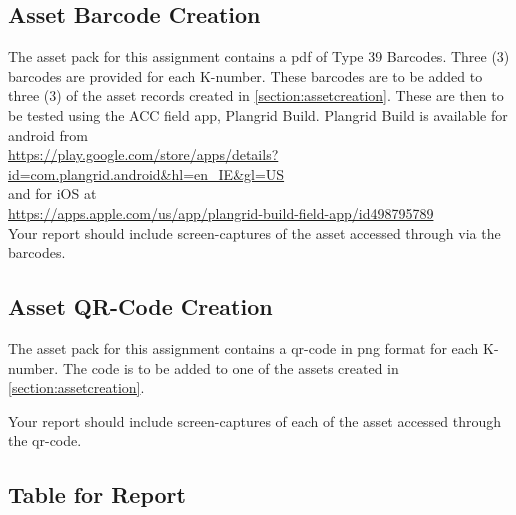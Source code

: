 \subsection{Asset Barcode Creation}
The asset pack for this assignment contains a pdf of Type 39 Barcodes.  Three (3) barcodes are provided for each K-number.  These barcodes are to be added to three (3) of the asset records created in \ref{section:assetcreation}.  These are then to be tested using the ACC field app, Plangrid Build.  Plangrid Build is available for android from\\ \href{https://play.google.com/store/apps/details?id=com.plangrid.android&hl=en_IE&gl=US}{https://play.google.com/store/apps/details?id=com.plangrid.android\&hl=en\_IE\&gl=US} \\and for iOS at\\ \href{https://apps.apple.com/us/app/plangrid-build-field-app/id498795789}{https://apps.apple.com/us/app/plangrid-build-field-app/id498795789}\\
Your report should include screen-captures of the asset accessed through via the barcodes.

\subsection{Asset QR-Code Creation}
The asset pack for this assignment contains a qr-code in png format for each K-number.  The code is to be added to one of the assets created in \ref{section:assetcreation}.

Your report should include screen-captures of each of the asset accessed through the qr-code.

\newpage
\subsection{Table for Report}

